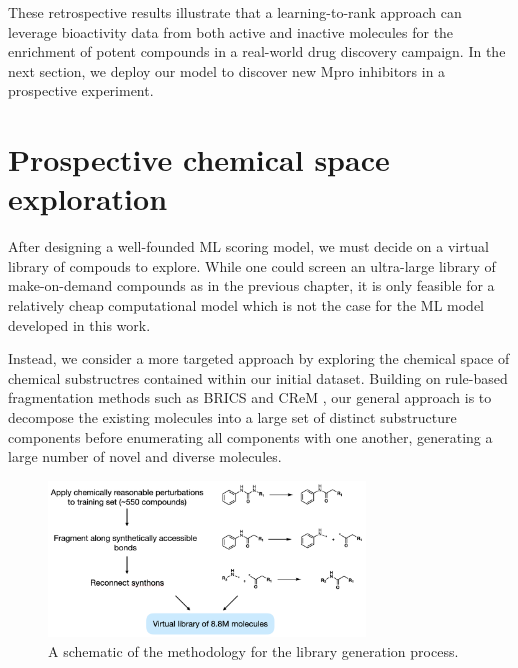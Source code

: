 These retrospective results illustrate that a learning-to-rank approach can leverage bioactivity data from both active and inactive molecules for the enrichment of potent compounds in a real-world drug discovery campaign. In the next section, we deploy our model to discover new Mpro inhibitors in a prospective experiment.

\section{Prospective chemical space exploration}

After designing a well-founded ML scoring model, we must decide on a virtual library of compouds to explore. While one could screen an ultra-large library of make-on-demand compounds as in the previous chapter, it is only feasible for a relatively cheap computational model which is not the case for the ML model developed in this work. 

Instead, we consider a more targeted approach by exploring the chemical space of chemical substructres contained within our initial dataset. Building on rule-based fragmentation methods such as BRICS \cite{Degen2008brics} and CReM \cite{Polishchuk2020Crem}, our general approach is to decompose the existing molecules into a large set of distinct substructure components before enumerating all components with one another, generating a large number of novel and diverse molecules.

\begin{figure}[!th]
    \centering
        \includegraphics[width=0.75\textwidth]{Chapters/Ranking/Figs/library.png}
        \caption{A schematic of the methodology for the library generation process.}
        \label{fig:library}
\end{figure}

